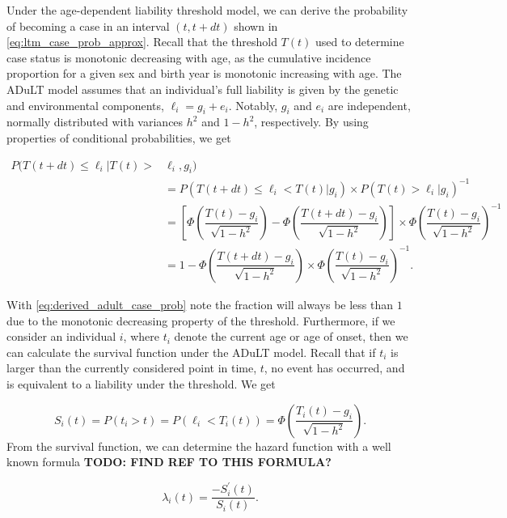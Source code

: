 Under the age-dependent liability threshold model, we can derive the probability of becoming a case in an interval $ (t, t+ dt) $ shown in \cref{eq:ltm_case_prob_approx}. Recall that the threshold $ T(t) $ used to determine case status is monotonic decreasing with age, as the cumulative incidence proportion for a given sex and birth year is monotonic increasing with age. The ADuLT model assumes that an individual's full liability is given by the genetic and environmental components, $ \ell_i = g_i + e_i $. Notably, $ g_i $ and $ e_i $ are independent, normally distributed with variances $ h^2 $ and $ 1 - h^2 $, respectively. By using properties of conditional probabilities, we get


\begin{align}
	P(T(t + dt) \leq \ell_i | T(t) >& \ell_i, g_i)  \\
	&=P(T(t + dt) \leq \ell_i < T(t)|g_i) \times P(T(t) > \ell_i | g_i)^{-1}  \\
	&=
	\left[\Phi\left( \dfrac{T(t) - g_i}{\sqrt{1 - h^2}}\right) - \Phi\left( \dfrac{T(t + dt) - g_i}{\sqrt{1 - h^2}}\right)\right] \times
	\Phi \left( \dfrac{T(t) - g_i}{\sqrt{1 - h^2}}\right)^{-1} \\
	&=
	1 - \Phi\left( \dfrac{T(t + dt) - g_i}{\sqrt{1 - h^2}}\right) \times \Phi\left( \dfrac{T(t) - g_i}{\sqrt{1 - h^2}}\right)^{-1} \label{eq:derived_adult_case_prob}.
\end{align}

With \cref{eq:derived_adult_case_prob} note the fraction will always be less than $ 1 $ due to the monotonic decreasing property of the threshold. Furthermore, if we consider an individual $ i $, where $ t_i $ denote the current age or age of onset, then we can calculate the survival function under the ADuLT model. Recall that if $ t_i $ is larger than the currently considered point in time, $ t $, no event has occurred, and is equivalent to a liability under the threshold. We get


\begin{equation}
S_i(t) = P(t_i > t) = P\left(\ell_i < T_i(t) \right) = \Phi\left(\dfrac{T_i(t) - g_i}{\sqrt{1 - h^2}}\right).
\end{equation}
From the survival function, we can determine the hazard function with a well known formula \textbf{TODO: FIND REF TO THIS FORMULA?}

\begin{equation}
\lambda_i(t) = \dfrac{-S_i^{'}(t)}{S_i(t)}.
\end{equation}

